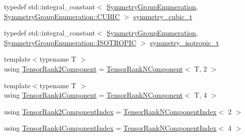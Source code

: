 \begin{DoxyCompactItemize}
\item 
typedef std\+::integral\+\_\+constant$<$ \mbox{\hyperlink{namespacempc_1_1core_a9d979684062547055a0ef5c13077bad8}{Symmetry\+Group\+Enumeration}}, \mbox{\hyperlink{namespacempc_1_1core_a9d979684062547055a0ef5c13077bad8accd681e34e5e40fbce74618c3ccffcff}{Symmetry\+Group\+Enumeration\+::\+C\+U\+B\+IC}} $>$ \mbox{\hyperlink{namespacempc_1_1core_a500c5dc401a79c05b1d1cbdba6f273eb}{symmetry\+\_\+cubic\+\_\+t}}
\item 
typedef std\+::integral\+\_\+constant$<$ \mbox{\hyperlink{namespacempc_1_1core_a9d979684062547055a0ef5c13077bad8}{Symmetry\+Group\+Enumeration}}, \mbox{\hyperlink{namespacempc_1_1core_a9d979684062547055a0ef5c13077bad8a099d59049574174a1c19567d38b479c2}{Symmetry\+Group\+Enumeration\+::\+I\+S\+O\+T\+R\+O\+P\+IC}} $>$ \mbox{\hyperlink{namespacempc_1_1core_a0d4476fe9836edb1425ecd07097c9330}{symmetry\+\_\+isotropic\+\_\+t}}
\item 
{\footnotesize template$<$typename T $>$ }\\using \mbox{\hyperlink{namespacempc_1_1core_a467e1fa517a8c269b033fef3aa281360}{Tensor\+Rank2\+Component}} = \mbox{\hyperlink{classmpc_1_1core_1_1_tensor_rank_n_component}{Tensor\+Rank\+N\+Component}}$<$ T, 2 $>$
\item 
{\footnotesize template$<$typename T $>$ }\\using \mbox{\hyperlink{namespacempc_1_1core_ac3a232afc7c680d580628e834030482f}{Tensor\+Rank4\+Component}} = \mbox{\hyperlink{classmpc_1_1core_1_1_tensor_rank_n_component}{Tensor\+Rank\+N\+Component}}$<$ T, 4 $>$
\item 
using \mbox{\hyperlink{namespacempc_1_1core_a7ae080dac58868c1e167479dce34928a}{Tensor\+Rank2\+Component\+Index}} = \mbox{\hyperlink{classmpc_1_1core_1_1_tensor_rank_n_component_index}{Tensor\+Rank\+N\+Component\+Index}}$<$ 2 $>$
\item 
using \mbox{\hyperlink{namespacempc_1_1core_a54c081f41b2475abd10182bf023805d2}{Tensor\+Rank4\+Component\+Index}} = \mbox{\hyperlink{classmpc_1_1core_1_1_tensor_rank_n_component_index}{Tensor\+Rank\+N\+Component\+Index}}$<$ 4 $>$
\end{DoxyCompactItemize}
